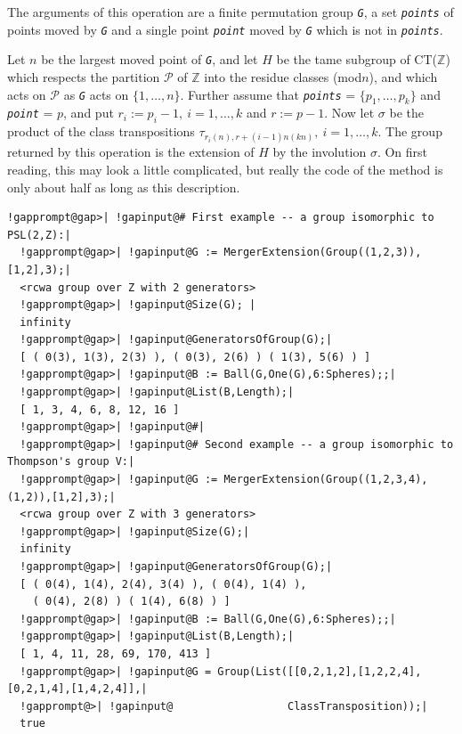 \documentclass[a4paper,11pt]{report}
\begin{document}
{{{ The arguments of this operation are a finite permutation group \mbox{\texttt{\mdseries\slshape G}}, a set \mbox{\texttt{\mdseries\slshape points}} of points moved by \mbox{\texttt{\mdseries\slshape G}} and a single point \mbox{\texttt{\mdseries\slshape point}} moved by \mbox{\texttt{\mdseries\slshape G}} which is not in \mbox{\texttt{\mdseries\slshape points}}. 

 Let $n$ be the largest moved point of \mbox{\texttt{\mdseries\slshape G}}, and let $H$ be the tame subgroup of CT({\ensuremath{\mathbb Z}}) which respects the
partition $\mathcal{P}$ of {\ensuremath{\mathbb Z}} into the residue classes (mod{\nobreakspace}$n$), and which acts on $\mathcal{P}$ as \mbox{\texttt{\mdseries\slshape G}} acts on $\{1, \dots, n\}$. Further assume that \mbox{\texttt{\mdseries\slshape points}} = $\{p_1, \dots, p_k\}$ and \mbox{\texttt{\mdseries\slshape point}} = $p$, and put $r_i := p_i-1, \ i = 1, \dots, k$ and $r := p-1$. Now let $\sigma$ be the product of the class transpositions $\tau_{r_i(n),r+(i-1)n(kn)}, \ i = 1, \dots, k$. The group returned by this operation is the extension of $H$ by the involution $\sigma$. \texttt{}\texttt{} On first reading, this may look a
little complicated, but really the code of the method is only about half as
long as this description. 
\begin{Verbatim}[commandchars=!@|,fontsize=\small,frame=single,label=Example]
  !gapprompt@gap>| !gapinput@# First example -- a group isomorphic to PSL(2,Z):|
  !gapprompt@gap>| !gapinput@G := MergerExtension(Group((1,2,3)),[1,2],3);|
  <rcwa group over Z with 2 generators>
  !gapprompt@gap>| !gapinput@Size(G); |
  infinity
  !gapprompt@gap>| !gapinput@GeneratorsOfGroup(G);|
  [ ( 0(3), 1(3), 2(3) ), ( 0(3), 2(6) ) ( 1(3), 5(6) ) ]
  !gapprompt@gap>| !gapinput@B := Ball(G,One(G),6:Spheres);;|
  !gapprompt@gap>| !gapinput@List(B,Length);|
  [ 1, 3, 4, 6, 8, 12, 16 ]
  !gapprompt@gap>| !gapinput@#|
  !gapprompt@gap>| !gapinput@# Second example -- a group isomorphic to Thompson's group V:|
  !gapprompt@gap>| !gapinput@G := MergerExtension(Group((1,2,3,4),(1,2)),[1,2],3);|
  <rcwa group over Z with 3 generators>
  !gapprompt@gap>| !gapinput@Size(G);|
  infinity
  !gapprompt@gap>| !gapinput@GeneratorsOfGroup(G);|
  [ ( 0(4), 1(4), 2(4), 3(4) ), ( 0(4), 1(4) ),
    ( 0(4), 2(8) ) ( 1(4), 6(8) ) ]
  !gapprompt@gap>| !gapinput@B := Ball(G,One(G),6:Spheres);;|
  !gapprompt@gap>| !gapinput@List(B,Length);|
  [ 1, 4, 11, 28, 69, 170, 413 ]
  !gapprompt@gap>| !gapinput@G = Group(List([[0,2,1,2],[1,2,2,4],[0,2,1,4],[1,4,2,4]],|
  !gapprompt@>| !gapinput@                  ClassTransposition));|
  true
\end{Verbatim}
 }

}}
\end{document}
